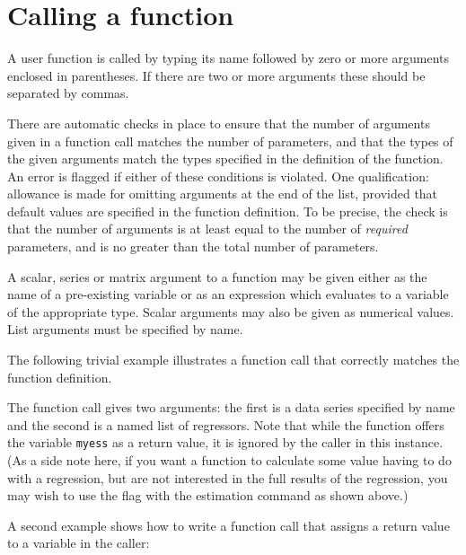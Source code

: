 \section{Calling a function}
\label{func-call}

A user function is called by typing its name followed by zero or more
arguments enclosed in parentheses.  If there are two or more arguments
these should be separated by commas.  

There are automatic checks in place to ensure that the number of
arguments given in a function call matches the number of parameters,
and that the types of the given arguments match the types specified in
the definition of the function.  An error is flagged if either of
these conditions is violated.  One qualification: allowance is made
for omitting arguments at the end of the list, provided that default
values are specified in the function definition.  To be precise, the
check is that the number of arguments is at least equal to the number
of \textit{required} parameters, and is no greater than the total
number of parameters.

A scalar, series or matrix argument to a function may be given either
as the name of a pre-existing variable or as an expression which
evaluates to a variable of the appropriate type.  Scalar arguments may
also be given as numerical values.  List arguments must be specified
by name.

The following trivial example illustrates a function call that
correctly matches the function definition.
    
The function call gives two arguments: the first is a data series
specified by name and the second is a named list of regressors.  Note
that while the function offers the variable \verb+myess+ as a return
value, it is ignored by the caller in this instance.  (As a side note
here, if you want a function to calculate some value having to do with
a regression, but are not interested in the full results of the
regression, you may wish to use the  flag with the
estimation command as shown above.)
    
A second example shows how to write a function call that assigns
a return value to a variable in the caller:
    
